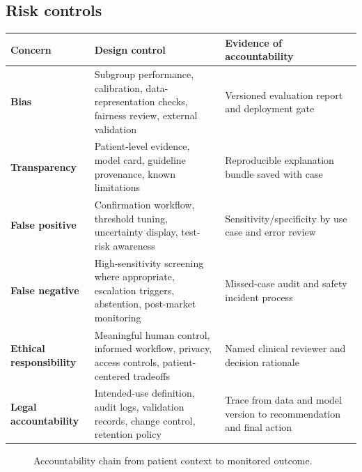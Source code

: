 \documentclass[11pt,a4paper]{article}
\begin{document}
\subsection{Risk controls}
\begin{tabularx}{\textwidth}{>{\bfseries\color{blue}}p{31mm} X X}
\toprule
Concern & Design control & Evidence of accountability\\
\midrule
Bias & Subgroup performance, calibration, data-representation checks, fairness review, external validation & Versioned evaluation report and deployment gate\\
Transparency & Patient-level evidence, model card, guideline provenance, known limitations & Reproducible explanation bundle saved with case\\
False positive & Confirmation workflow, threshold tuning, uncertainty display, test-risk awareness & Sensitivity/specificity by use case and error review\\
False negative & High-sensitivity screening where appropriate, escalation triggers, abstention, post-market monitoring & Missed-case audit and safety incident process\\
Ethical responsibility & Meaningful human control, informed workflow, privacy, access controls, patient-centered tradeoffs & Named clinical reviewer and decision rationale\\
Legal accountability & Intended-use definition, audit logs, validation records, change control, retention policy & Trace from data and model version to recommendation and final action\\
\bottomrule
\end{tabularx}

\begin{figure}[ht]
\centering
{}
\caption{Accountability chain from patient context to monitored outcome.}
\end{figure}
\end{document}
